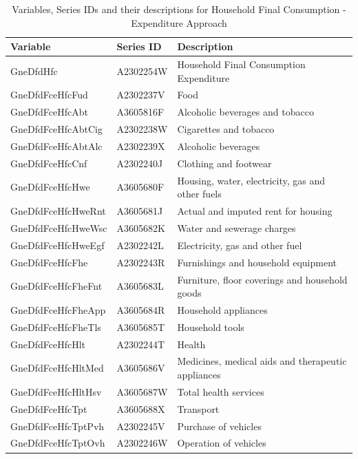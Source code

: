 \documentclass[graybox]{svmult}
\begin{document}
\begin{table}[t]
	\caption{Variables, Series IDs and their descriptions for Household Final Consumption - Expenditure Approach}
	\small
	\centering
		\begin{tabular*}{\columnwidth}[width = \textwidth]{lll}
			
			\toprule
			\textbf{Variable} & \textbf{Series ID} & \textbf{Description}\\
			\midrule
			
			GneDfdHfc & A2302254W & Household Final Consumption Expenditure\\
			GneDfdFceHfcFud & A2302237V & Food\\
			GneDfdFceHfcAbt & A3605816F & Alcoholic beverages and tobacco\\
			GneDfdFceHfcAbtCig & A2302238W & Cigarettes and tobacco\\
			GneDfdFceHfcAbtAlc & A2302239X & Alcoholic beverages\\
			\addlinespace
			GneDfdFceHfcCnf & A2302240J & Clothing and footwear\\
			GneDfdFceHfcHwe & A3605680F & Housing, water, electricity, gas and other fuels\\
			GneDfdFceHfcHweRnt & A3605681J & Actual and imputed rent for housing\\
			GneDfdFceHfcHweWsc & A3605682K & Water and sewerage charges\\
			GneDfdFceHfcHweEgf & A2302242L & Electricity, gas and other fuel\\
			\addlinespace
			GneDfdFceHfcFhe & A2302243R & Furnishings and household equipment\\
			GneDfdFceHfcFheFnt & A3605683L & Furniture, floor coverings and household goods\\
			GneDfdFceHfcFheApp & A3605684R & Household appliances\\
			GneDfdFceHfcFheTls & A3605685T & Household tools\\
			GneDfdFceHfcHlt & A2302244T & Health\\
			\addlinespace
			GneDfdFceHfcHltMed & A3605686V & Medicines, medical aids and therapeutic appliances\\
			GneDfdFceHfcHltHsv & A3605687W & Total health services\\
			GneDfdFceHfcTpt & A3605688X & Transport\\
			GneDfdFceHfcTptPvh & A2302245V & Purchase of vehicles\\
			GneDfdFceHfcTptOvh & A2302246W & Operation of vehicles\\

\end{tabular*}
\end{table}
\end{document}
